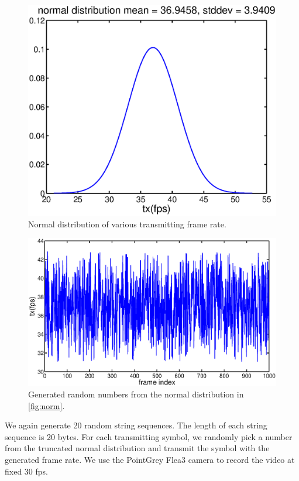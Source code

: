 \begin{figure}[!htb]
  \centering
  \includegraphics[scale=0.3]{fig/norm.eps}
  \caption{Normal distribution of various transmitting frame rate.}
  \label{fig:norm}
\end{figure}

\begin{figure}[!htb]
  \centering
  \includegraphics[scale=0.25]{fig/norm_vary.eps}
  \caption{Generated random numbers from the normal distribution in \autoref{fig:norm}.}
  \label{fig:norm_vary}
\end{figure}

We again generate 20 random string sequences. The length of each string sequence is 20 bytes. For each transmitting symbol, we randomly pick a number from the truncated normal distribution and transmit the symbol with the generated frame rate.
We use the PointGrey Flea3 camera to record the video at fixed 30 fps. 

